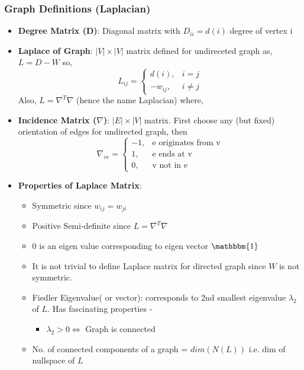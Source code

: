 \documentclass{article}
\begin{document}
\subsubsection{Graph Definitions (Laplacian)}
\begin{itemize}
    \item \textbf{Degree Matrix (D)}: Diagonal matrix with $D_{ii}=d(i)$ degree of vertex i
    \item \textbf{Laplace of Graph}: $|V| \times |V|$ matrix defined for undireceted graph as, $L = D-W$ so, $$L_{ij} = \begin{cases} d(i), & i=j\\ -w_{ij}, & i \neq j \end{cases}$$
    Also, $L = \nabla ^T \nabla$ (hence the name Laplacian) where,
    \item \textbf{Incidence Matrix ($\nabla$)}: $|E| \times |V|$ matrix. First choose any (but fixed) orientation of edges for undirected graph, then $$\nabla_{ve} = \begin{cases} -1, & \text{e originates from v} \\ 1, & \text{e ends at v} \\ 0, & \text{v not in e} \end{cases}$$
    \item \textbf{Properties of Laplace Matrix}:
        \begin{itemize}
            \item Symmetric since $w_{ij} = w_{ji}$
            \item Positive Semi-definite since $L = \nabla^T \nabla$
            \item $0$ is an eigen value corresponding to eigen vector $\mathbbm{1}$
            \item It is not trivial to define Laplace matrix for directed graph since $W$ is not symmetric.
            \item Fiedler Eigenvalue( or vector): corresponds to 2nd smallest eigenvalue $\lambda_2$ of $L$. Has fascinating properties - 
                \begin{itemize}
                    \item $\lambda_2>0 \iff $ Graph is connected
                \end{itemize}
            \item No. of connected components of a graph  = $dim(N(L))$ i.e. dim of nullspace of $L $
        \end{itemize}
\end{itemize}
\end{document}

